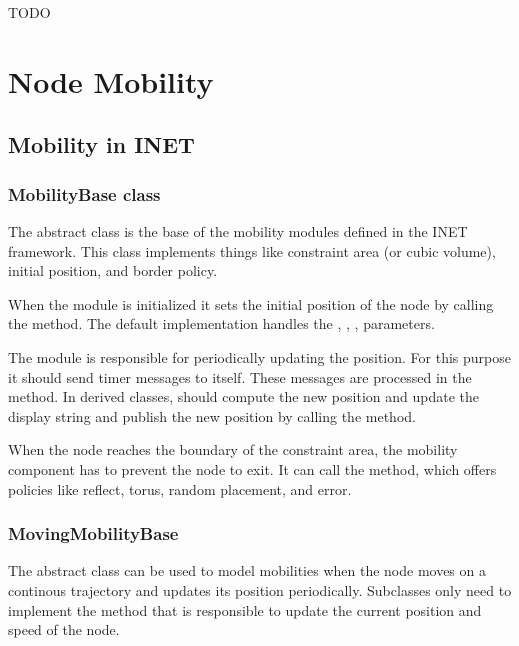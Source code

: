 \ifdraft TODO

\chapter{Node Mobility}
\label{cha:mobility}

\section{Mobility in INET}

\subsection{MobilityBase class}

The abstract  class is the base of the mobility
modules defined in the INET framework. This class implements things like
constraint area (or cubic volume), initial position, and border policy.

When the module is initialized it sets the initial position of the node
by calling the  method. The default implementation
handles the , , , 
parameters.

The module is responsible for periodically updating the position.
For this purpose it should send timer messages to itself. These messages
are processed in the  method. In derived
classes,  should compute the new position
and update the display string and publish the new position by calling
the  method.

When the node reaches the boundary of the constraint area, the mobility
component has to prevent the node to exit. It can call the
 method, which offers policies like
reflect, torus, random placement, and error.



\subsection{MovingMobilityBase}

The abstract  class can be used to model
mobilities when the node moves on a continous trajectory and
updates its position periodically. Subclasses only need to implement
the  method that is responsible to update the current
position and speed of the node.

